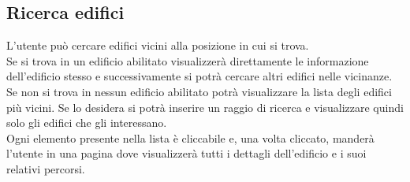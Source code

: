 \subsection{Ricerca edifici}
L'utente può cercare edifici vicini alla posizione in cui si trova. \\ 
Se si trova in un edificio abilitato visualizzerà direttamente le informazione dell'edificio stesso e successivamente si potrà cercare altri edifici nelle vicinanze. \\ 
Se non si trova in nessun edificio abilitato potrà visualizzare la lista degli edifici più vicini. Se lo desidera si potrà inserire un raggio di ricerca e visualizzare quindi solo gli edifici che gli interessano. \\
Ogni elemento presente nella lista è cliccabile e, una volta cliccato, manderà l'utente in una pagina dove visualizzerà tutti i dettagli dell'edificio e i suoi relativi percorsi.
